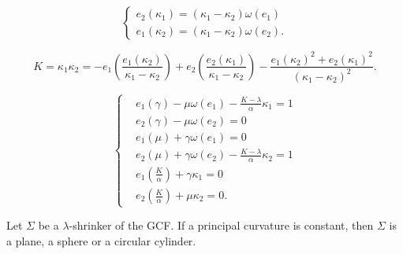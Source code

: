\documentclass[10pt,a4paper]{amsart}
\begin{document}
\begin{equation}\label{b1}
    \left\{
    \begin{array}{ll}
        e_{2}(\kappa_1)=(\kappa_1-\kappa_2)\omega(e_1)\\
        e_{1}(\kappa_2)=(\kappa_1-\kappa_2)\omega(e_2).
    \end{array}
    \right.
\end{equation}

\begin{equation}\label{bb}
   K=\kappa_1\kappa_2=-e_1\left(\frac{e_1( \kappa_2 )}{\kappa_1-\kappa_2} \right)+e_2\left(\frac{e_2( \kappa_1 )}{\kappa_1 -\kappa_2}\right)
   -\frac{e_1( \kappa_2)^2+ e_2( \kappa_1 )^2}{(\kappa_1 -\kappa_2)^2}.
\end{equation}

    \begin{equation}\label{d3}
    \left\{
\begin{split}
            &e_{1}(\gamma)-\mu\omega(e_1)-\frac{K-\lambda}{\alpha}\kappa_1=1\\
            &e_{2}(\gamma)-\mu\omega(e_2)=0\\
            &e_{1}(\mu)+\gamma\omega(e_1)=0\\
            &e_{2}(\mu)+\gamma\omega(e_2)-\frac{K-\lambda}{\alpha}\kappa_2=1\\
            &e_{1}(\frac{K}{\alpha})+\gamma\kappa_1=0\\
            &e_{2}(\frac{K}{\alpha})+\mu\kappa_2=0.
        \end{split}\right.
    \end{equation}

\begin{theorem}\label{t-d} Let $\Sigma$ be a $\lambda$-shrinker of the GCF. If a principal curvature is constant, then $\Sigma$ is a plane, a sphere or a circular cylinder. 
\end{theorem}
\end{document}
